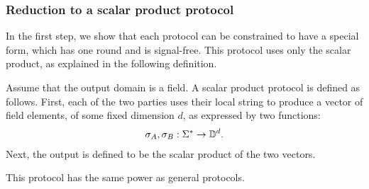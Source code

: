 \subsubsection{Reduction to a scalar product protocol}
\label{sec:reduction-to-scalar-product-protocols}

In the first step, we show that each protocol can be constrained to have a special form, which has one round and is signal-free. This protocol uses only the scalar product,  as explained in the following definition. 
\begin{definition} \label{def:scalar-product-protocol}
    Assume that the output domain is a field.
    A scalar product protocol is defined as follows. First, each of the two parties uses their local string to  produce a vector of field elements, of some fixed dimension $d$, as expressed by two functions: 
    \begin{align*}
    \sigma_A, \sigma_B : \Sigma^* \to \mathbb D^d.
    \end{align*}
    Next, the output is defined to be the scalar product of the two vectors. 
\end{definition}

This protocol has the same power as general protocols. 

